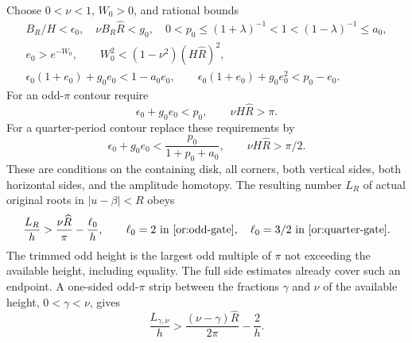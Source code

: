 \documentclass[11pt,reqno]{amsart}
\numberwithin{equation}{section}
\theoremstyle{definition}
\theoremstyle{remark}
\begin{document}
Choose $0<\nu<1$, $W_0>0$, and rational bounds
\begin{equation}\label{or:contour-gates}
 \begin{gathered}
 B_R/H<\epsilon_0,\quad \nu B_R\widehat R<g_0,\quad
 0<p_0\le(1+\lambda)^{-1}<1<(1-\lambda)^{-1}\le a_0,\\
 e_0>e^{-W_0},\qquad
 W_0^2<(1-\nu^2)(H\widehat R)^2,\\
 \epsilon_0(1+e_0)+g_0e_0<1-a_0e_0,\qquad
 \epsilon_0(1+e_0)+g_0e_0^2<p_0-e_0.
 \end{gathered}
\end{equation}
For an odd-$\pi$ contour require
\begin{equation}\label{or:odd-gate}
      \epsilon_0+g_0e_0<p_0,\qquad \nu H\widehat R>\pi.
\end{equation}
For a quarter-period contour replace these requirements by
\begin{equation}\label{or:quarter-gate}
 \epsilon_0+g_0e_0<\frac{p_0}{1+p_0+a_0},\qquad
                        \nu H\widehat R>\pi/2.
\end{equation}
These are conditions on the containing disk, all corners, both vertical
sides, both horizontal sides, and the amplitude homotopy.  The resulting
number $L_R$ of actual original roots in $|u-\beta|<R$ obeys
\begin{equation}\label{or:counts}
 \frac{L_R}{h}>\frac{\nu\widehat R}{\pi}-\frac{\ell_0}{h},
 \qquad
 \ell_0=2\ \hbox{in \eqref{or:odd-gate}},\quad
 \ell_0=3/2\ \hbox{in \eqref{or:quarter-gate}}.
\end{equation}
The trimmed odd height is the largest odd multiple of $\pi$ not
exceeding the available height, including equality.  The full side
estimates already cover such an endpoint.  A one-sided odd-$\pi$ strip
between the fractions $\gamma$ and $\nu$ of the available height,
$0<\gamma<\nu$, gives
\begin{equation}\label{or:one-sided-count}
                    \frac{L_{\gamma,\nu}}h>
           \frac{(\nu-\gamma)\widehat R}{2\pi}-\frac2h.
\end{equation}
\end{document}
